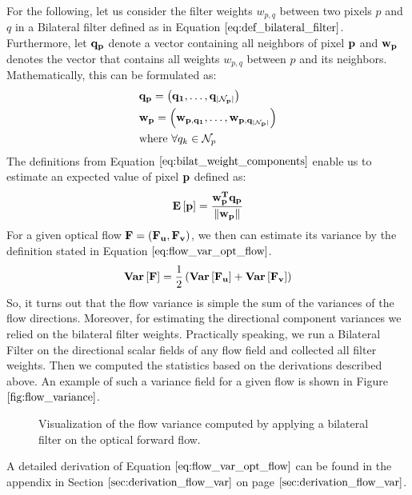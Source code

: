 For the following, let us consider the filter weights $w_{p,q}$ between two pixels $p$ and $q$ in a Bilateral filter defined as in Equation $\ref{eq:def_bilateral_filter}$. Furthermore, let $\bf{q}_p$ denote a vector containing all neighbors of pixel $\bf{p}$ and $\bf{w}_p$ denotes the vector that contains all weights $w_{p,q}$ between $p$ and its neighbors. Mathematically, this can be formulated as:
\begin{equation}
\begin{aligned}
& \bf{q_p} = \left( q_1, \dots, q_{|\mathcal{N}_p|} \right) \\
& \bf{w_p} = \left( w_{p, q_1}, \dots, w_{p, q_{|\mathcal{N}_p|}} \right) \\
& \text{where } \forall q_k \in \mathcal{N}_p
\end{aligned}
\label{eq:bilat_weight_components}
\end{equation}
The definitions from Equation $\ref{eq:bilat_weight_components}$ enable us to estimate an expected value of pixel $\bf{p}$ defined as:
\begin{equation}
	\mathbf{E} \left[ \bf{p} \right] = \frac{\bf{w}_{p}^{T} \bf{q}_p}{\left\lVert\bf{w}_{p}\right\rVert}
\end{equation}
For a given optical flow $\bf{F} = (\bf{F_u}, \bf{F_v})$, we then can estimate its variance by the definition stated in Equation $\ref{eq:flow_var_opt_flow}$.
\begin{equation}
	\mathbf{Var} \left[ \bf{F} \right] = \frac{1}{2} \left( \mathbf{Var} \left[ \bf{F_u} \right] + \mathbf{Var} \left[ \bf{F_v} \right] \right)
\label{eq:flow_var_opt_flow}	
\end{equation}
So, it turns out that the flow variance is simple the sum of the variances of the flow directions. Moreover, for estimating the directional component variances we relied on the bilateral filter weights. Practically speaking, we run a Bilateral Filter on the directional scalar fields of any flow field and collected all filter weights. Then we computed the statistics based on the derivations described above. An example of such a variance field for a given flow is shown in Figure $\ref{fig:flow_variance}$.
\begin{figure}[H]
\begin{center}
\end{center}
\caption[Flow Variance]{Visualization of the flow variance computed by applying a bilateral filter on the optical forward flow.}
\label{fig:flow_variance}
\end{figure}
A detailed derivation of Equation $\ref{eq:flow_var_opt_flow}$ can be found in the appendix in Section $\ref{sec:derivation_flow_var}$ on page $\pageref{sec:derivation_flow_var}$.

